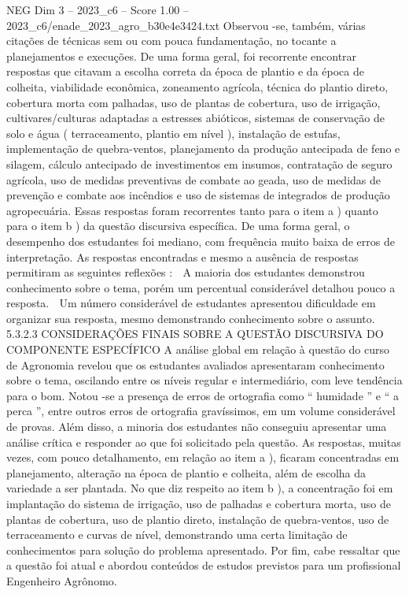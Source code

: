 \begin{textsample}{NEG Dim 3 – 2023\_c6 – Score 1.00 – 2023\_c6/enade\_2023\_agro\_b30e4e3424.txt}
Observou -se, também, várias citações de técnicas sem ou com pouca fundamentação, no tocante a planejamentos e execuções.
De uma forma geral, foi recorrente encontrar respostas que citavam a escolha correta da época de plantio e da época de colheita, viabilidade econômica, zoneamento agrícola, técnica do plantio direto, cobertura morta com palhadas, uso de plantas de cobertura, uso de irrigação, cultivares/culturas adaptadas a estresses abióticos, sistemas de conservação de solo e água ( terraceamento, plantio em nível ), instalação de estufas, implementação de quebra-ventos, planejamento da produção antecipada de feno e silagem, cálculo antecipado de investimentos em insumos, contratação de seguro agrícola, uso de medidas preventivas de combate ao geada, uso de medidas de prevenção e combate aos incêndios e uso de sistemas de integrados de produção agropecuária.
Essas respostas foram recorrentes tanto para o item a ) quanto para o item b ) da questão discursiva específica.
De uma forma geral, o desempenho dos estudantes foi mediano, com frequência muito baixa de erros de interpretação.
As respostas encontradas e mesmo a ausência de respostas permitiram as seguintes reflexões :  A maioria dos estudantes demonstrou conhecimento sobre o tema, porém um percentual considerável detalhou pouco a resposta.  Um número considerável de estudantes apresentou dificuldade em organizar sua resposta, mesmo demonstrando conhecimento sobre o assunto. 5.3.2.3 CONSIDERAÇÕES FINAIS SOBRE A QUESTÃO DISCURSIVA DO COMPONENTE ESPECÍFICO A análise global em relação à questão do curso de Agronomia revelou que os estudantes avaliados apresentaram conhecimento sobre o tema, oscilando entre os níveis regular e intermediário, com leve tendência para o bom.
Notou -se a presença de erros de ortografia como “ humidade ” e “ a perca ”, entre outros erros de ortografia gravíssimos, em um volume considerável de provas.
Além disso, a minoria dos estudantes não conseguiu apresentar uma análise crítica e responder ao que foi solicitado pela questão.
As respostas, muitas vezes, com pouco detalhamento, em relação ao item a ), ficaram concentradas em planejamento, alteração na época de plantio e colheita, além de escolha da variedade a ser plantada.
No que diz respeito ao item b ), a concentração foi em implantação do sistema de irrigação, uso de palhadas e cobertura morta, uso de plantas de cobertura, uso de plantio direto, instalação de quebra-ventos, uso de terraceamento e curvas de nível, demonstrando uma certa limitação de conhecimentos para solução do problema apresentado.
Por fim, cabe ressaltar que a questão foi atual e abordou conteúdos de estudos previstos para um profissional Engenheiro Agrônomo.

\end{textsample}
